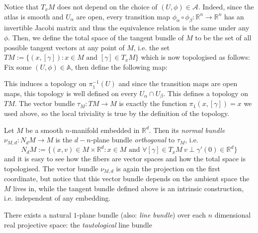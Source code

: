 \begin{examples}
\begin{i_enum}
Notice that $T_xM$ does not depend on the choice of $(U,\phi)\in\mathcal{A}$. Indeed, since the atlas is smooth and $U_{\alpha}$ are open, every transition map $\phi_{\alpha}\circ\phi_{\beta}:\mathbb{R}^n\to\mathbb{R}^n$ has an invertible Jacobi matrix and thus the equivalence relation is the same under any $\phi$. Then, we define the total space of the tangent bundle of $M$ to be the set of all possible tangent vectors at any point of $M$, i.e. the set
$TM:=\big\{(x,[\gamma]):x\in M\text{ and }[\gamma]\in T_xM\big\}$
which is now topologised as follows: Fix some $(U,\phi)\in\mathbb{A}$, then define the following map:
\begin{center}
\end{center}
This induces a topology on $\pi_1^{-1}(U)$ and since the transition maps are open maps, this topology is well defined on every $U_{\alpha}\cap U_{\beta}$. This defines a topology on $TM$. The vector bundle $\tau_{M}:TM\to M$ is exactly the function $\pi_1(x,[\gamma])=x$ we used above, so the local triviality is true by the definition of the topology.
\item Let $M$ be a smooth $n$-manifold embedded in $\mathbb{R}^d$. Then its \emph{normal bundle} $\nu_{M,d}:N_dM\to M$ is the $d-n$-plane bundle \emph{orthogonal} to $\tau_M$, i.e.
\[N_dM:=\big\{(x,v)\in M\times\mathbb{R}^d:x\in M\text{ and }\forall[\gamma]\in T_xM\ v\perp\gamma'(0)\in\mathbb{R}^d\big\}\]
and it is easy to see how the fibers are vector spaces and how the total space is topologised. The vector bundle $\nu_{M,d}$ is again the projection on the first coordinate, but notice that this vector bundle depends on the ambient space the $M$ lives in, while the tangent bundle defined above is an intrinsic construction, i.e. independent of any embedding.
\item There exists a natural $1$-plane bundle (also: \emph{line bundle}) over each $n$ dimensional real projective space: the \emph{tautological} line bundle
\begin{center}

\end{center}
\end{i_enum}
\end{examples}
